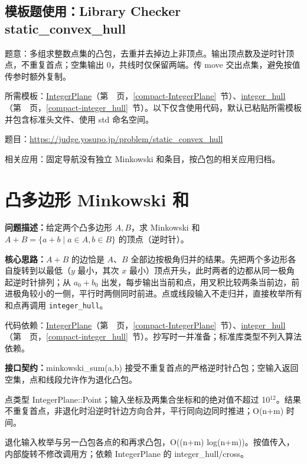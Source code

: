 

\Needspace{354pt}

\subsection*{模板题使用：Library Checker static\_convex\_hull}

\label{usage-example-64}

题意：多组求整数点集的凸包，去重并去掉边上非顶点。输出顶点数及逆时针顶点，不重复首点；空集输出 0，共线时仅保留两端。传 move 交出点集，避免按值传参时额外复制。

所需模板：\hyperref[compact-IntegerPlane]{IntegerPlane}（第~\pageref{compact-IntegerPlane}~页，\ref{compact-IntegerPlane}~节）、\hyperref[compact-integer_hull]{integer\_\allowbreak{}hull}（第~\pageref{compact-integer_hull}~页，\ref{compact-integer_hull}~节）。以下仅含使用代码，默认已粘贴所需模板并包含标准头文件、使用 std 命名空间。

题目：\url{https://judge.yosupo.jp/problem/static_convex_hull}



\noindent 相关应用：固定导航没有独立 Minkowski 和条目，按凸包的相关应用归档。

\section{凸多边形 Minkowski 和}\label{compact-minkowski_sum}

\noindent\textbf{问题描述：}\allowbreak 给定两个凸多边形 $A,B$，求 Minkowski 和 $A+B=\{a+b\mid a\in A,b\in B\}$ 的顶点（逆时针）。

\textbf{核心思路：}\allowbreak $A+B$ 的边恰是 $A$、$B$ 全部边按极角归并的结果。先把两个多边形各自旋转到以最低（$y$ 最小，其次 $x$ 最小）顶点开头，此时两者的边都从同一极角起逆时针排列；从 $a_0+b_0$ 出发，每步输出当前和点，用叉积比较两条当前边，前进极角较小的一侧，平行时两侧同时前进。点或线段输入不走归并，直接枚举所有和点再调用 \texttt{integer\_hull}。

代码依赖：\hyperref[compact-IntegerPlane]{IntegerPlane}（第~\pageref{compact-IntegerPlane}~页，\ref{compact-IntegerPlane}~节）、\hyperref[compact-integer_hull]{integer\_\allowbreak{}hull}（第~\pageref{compact-integer_hull}~页，\ref{compact-integer_hull}~节）。抄写时一并准备；标准库类型不列入算法依赖。

{\sloppy{}\noindent\textbf{接口契约：}minkowski\_sum(a,b) 接受不重复首点的严格逆时针凸包；空输入返回空集，点和线段允许作为退化凸包。

点类型 IntegerPlane::Point；输入坐标及两集合坐标和的绝对值不超过 10$^{12}$。结果不重复首点，非退化时沿逆时针边方向合并，平行同向边同时推进；O(n+m) 时间。

退化输入枚举与另一凸包各点的和再求凸包，O((n+m) log(n+m))。按值传入，内部旋转不修改调用方；依赖 IntegerPlane 的 integer\_hull/cross。\par}

